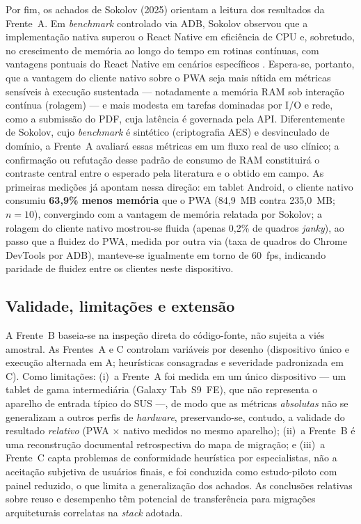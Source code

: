 Por fim, os achados de Sokolov (2025) orientam a leitura dos resultados da Frente~A. Em \emph{benchmark} controlado via ADB, Sokolov observou que a
implementação nativa superou o React Native em eficiência de CPU e, sobretudo, no
crescimento de memória ao longo do tempo em rotinas contínuas, com vantagens
pontuais do React Native em cenários específicos \cite{sokolov2025}. Espera-se,
portanto, que a vantagem do cliente nativo sobre o PWA seja mais nítida em métricas
sensíveis à execução sustentada --- notadamente a memória RAM sob interação
contínua (rolagem) --- e mais modesta em tarefas dominadas por I/O e rede, como a
submissão do PDF, cuja latência é governada pela API. Diferentemente de Sokolov,
cujo \emph{benchmark} é sintético (criptografia AES) e desvinculado de domínio, a
Frente~A avaliará essas métricas em um fluxo real de uso clínico; a confirmação ou
refutação desse padrão de consumo de RAM constituirá o contraste central entre o
esperado pela literatura e o obtido em campo. As primeiras medições já apontam
nessa direção: em tablet Android, o cliente nativo consumiu \textbf{63,9\% menos
memória} que o PWA (84,9~MB contra 235,0~MB; $n=10$), convergindo com a vantagem
de memória relatada por Sokolov; a rolagem do cliente nativo mostrou-se fluida (apenas 0,2\% de quadros
\emph{janky}), ao passo que a fluidez do PWA, medida por outra via (taxa de quadros
do Chrome DevTools por ADB), manteve-se igualmente em torno de 60~fps, indicando
paridade de fluidez entre os clientes neste dispositivo.

\subsection{Validade, limitações e extensão}
\label{sub:validade}

A Frente~B baseia-se na inspeção direta do código-fonte, não sujeita a viés
amostral. As Frentes~A e C controlam variáveis por desenho (dispositivo único e
execução alternada em A; heurísticas consagradas e severidade padronizada em C).
Como limitações: (i)~a Frente~A foi medida em um único dispositivo --- um tablet
de gama intermediária (Galaxy Tab~S9~FE), que não representa o aparelho de entrada
típico do SUS ---, de modo que as métricas \emph{absolutas} não se generalizam a
outros perfis de \emph{hardware}, preservando-se, contudo, a validade do resultado
\emph{relativo} (PWA $\times$ nativo medidos no mesmo aparelho); (ii)~a Frente~B é uma reconstrução documental
retrospectiva do mapa de migração; e (iii)~a Frente~C capta problemas de
conformidade heurística por especialistas, não a aceitação subjetiva de usuários
finais, e foi conduzida como estudo-piloto com painel reduzido, o que limita a generalização dos achados. As conclusões relativas sobre
reuso e desempenho têm potencial de transferência para migrações arquiteturais
correlatas na \emph{stack} adotada.
